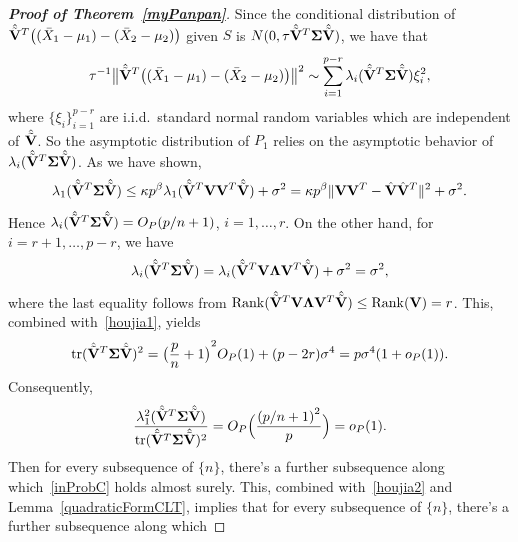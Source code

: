 \documentclass[review]{elsarticle}
\DeclareMathOperator{\myrank}{Rank}
\theoremstyle{plain}
\theoremstyle{definition}
\theoremstyle{remark}
\begin{document}
\begin{proof}[\textbf{Proof of Theorem~\ref{myPanpan}}]
    Since the conditional distribution of
    $\hat{\tilde{\mathbf{V}}}^T\big((\bar{X}_1-\mu_1)-(\bar{X}_2-\mu_2)\big)$ given $S$ is $N(0,\tau \hat{\tilde{\mathbf{V}}}^T\boldsymbol{\Sigma}\hat{\tilde{\mathbf{V}}})$,
    we have that
\begin{equation}\label{houjia2}
\tau^{-1}\big\|\hat{\tilde{\mathbf{V}}}^T\big((\bar{X}_1-\mu_1)-(\bar{X}_2-\mu_2)\big)\big\|^2
\sim
    \sum_{i=1}^{p-r} \lambda_i(\hat{\tilde{\mathbf{V}}}^T\boldsymbol{\Sigma}\hat{\tilde{\mathbf{V}}})\xi_i^2,
\end{equation}
where $\{\xi_i\}_{i=1}^{p-r}$ are i.i.d.\  standard normal random variables which are independent of $\hat{\tilde{\mathbf{V}}}$.
    So the asymptotic distribution of $P_1$ relies on the asymptotic behavior of $\lambda_i(\hat{\tilde{\mathbf{V}}}^T\boldsymbol{\Sigma}\hat{\tilde{\mathbf{V}}})$.
    As we have shown,
     \begin{equation}\label{houjia1}
     \lambda_1(\hat{\tilde{\mathbf{V}}}^T\boldsymbol{\Sigma}\hat{\tilde{\mathbf{V}}})\leq 
     \kappa p^{\beta}\lambda_1(\hat{\tilde{\mathbf{V}}}^T \mathbf{V} \mathbf{V}^T\hat{\tilde{\mathbf{V}}})+\sigma^2
     =
    \kappa p^\beta \|\mathbf{V}\mathbf{V}^T -\hat{\mathbf{V}}\hat{\mathbf{V}}^T\|^2+\sigma^2.
     \end{equation}
    Hence $\lambda_i(\hat{\tilde{\mathbf{V}}}^T\boldsymbol{\Sigma}\hat{\tilde{\mathbf{V}}})=O_P({p}/{n}+1)$, $i=1,\ldots,r$.
    On the other hand,
    for $i=r+1,\ldots,p-r$,
    we have
    \begin{equation}\label{houjia3}
    \lambda_i(\hat{\tilde{\mathbf{V}}}^T\boldsymbol{\Sigma}\hat{\tilde{\mathbf{V}}})
    =
    \lambda_i(\hat{\tilde{\mathbf{V}}}^T \mathbf{V} \boldsymbol{\Lambda} \mathbf{V}^T \hat{\tilde{\mathbf{V}}})+\sigma^2
    =\sigma^2,
    \end{equation}
where the last equality follows from $\myrank(\hat{\tilde{\BV}}^T \BV \bLambda \BV^T \hat{\tilde{\BV}})\leq \myrank(\BV)=r$.
This, combined with~\eqref{houjia1}, yields
\begin{equation}\label{traceA1}
\mathrm{tr}(\hat{\tilde{\mathbf{V}}}^T\boldsymbol{\Sigma}\hat{\tilde{\mathbf{V}}})^2=
    {\big(\frac{p}{n}+1\big)}^2O_P(1)
    +
    (p-2r)\sigma^4
    =p\sigma^4(1+o_P(1)).
\end{equation}
Consequently,
\begin{equation}\label{inProbC}
        \frac{\lambda_1^2(\hat{\tilde{\mathbf{V}}}^T\boldsymbol{\Sigma}\hat{\tilde{\mathbf{V}}})}{\mathrm{tr}(\hat{\tilde{\mathbf{V}}}^T\boldsymbol{\Sigma}\hat{\tilde{\mathbf{V}}})^2}
        =O_P\Big(\frac{{(p/n+1)}^2}{p}\Big)=o_P(1).
\end{equation}
Then for every subsequence of $\{n\}$, there's a further subsequence along which~\eqref{inProbC} holds almost surely.
This, combined with~\eqref{houjia2} and Lemma~\ref{quadraticFormCLT}, implies that for every subsequence of $\{n\}$, there's a further subsequence along which

\end{proof}
\end{document}
